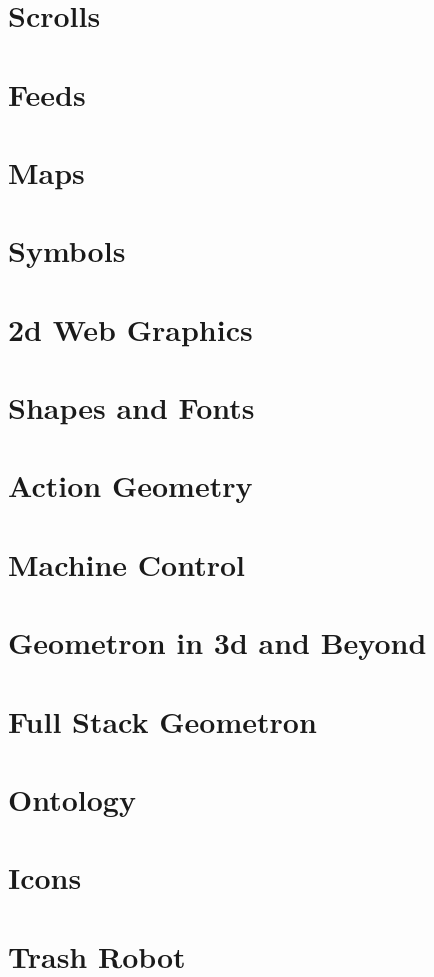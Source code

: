 \documentclass{report}
\begin{document}
\chapter{Scrolls}

\chapter{Feeds}

\chapter{Maps}

\chapter{Symbols}

\chapter{2d Web Graphics}

\chapter{Shapes and Fonts}

\chapter{Action Geometry}

\chapter{Machine Control}

\chapter{Geometron in 3d and Beyond}

\chapter{Full Stack Geometron}

\chapter{Ontology}

\chapter{Icons}
\chapter{Trash Robot}



\end{document}

